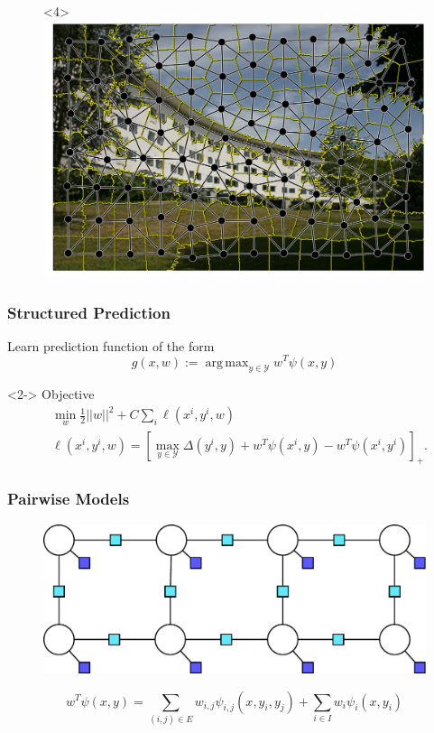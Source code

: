 \documentclass[final,ignorenonframetext,compress]{beamer}
\DeclareMathOperator*{\argmax}{arg\,max}
\newcommand{\hoch}[1]{^{#1}}
\begin{document}
\begin{frame}
\begin{figure}
        \begin{onlyenv}<4>
            \includegraphics[width=.6\linewidth]{images/scene_sp_graph}%
        \end{onlyenv}%
    \end{figure}
\end{frame}

\begin{frame}
    \frametitle{Structured Prediction}
    Learn prediction function of the form
    \[g(x, w) := \argmax_{y \in \mathcal{Y}}  w^T \psi(x, y) \]
    \begin{visibleenv}<2->
        Objective
        \begin{align*}
            &\min_w \frac{1}{2} ||w||^2 + C \sum_i  \ell(x\hoch{i}, y\hoch{i}, w)\\
            &\ell(x\hoch{i}, y\hoch{i}, w) = [\max_{y \in \mathcal{Y}} \Delta(y\hoch{i}, y) + w^T \psi(x\hoch{i}, y) - w^T \psi(x\hoch{i}, y\hoch{i})]_+.
        \end{align*}
    \citet{joachims2009cutting}
    \end{visibleenv}

\end{frame}

\begin{frame}
    \frametitle{Pairwise Models}
    \begin{centering}
        \begin{figure}
            \includegraphics[width=.7\linewidth]{images/pairwise_factorgraph2}
        \end{figure}
    \end{centering}
    \vspace{5mm}
    \[w^T \psi(x, y) = \sum_{(i, j) \in E} w_{i,j} \psi_{i,j}(x, y_i, y_j) + \sum_{i\in I} w_i \psi_i(x, y_i)\]
\end{frame}
\end{document}
